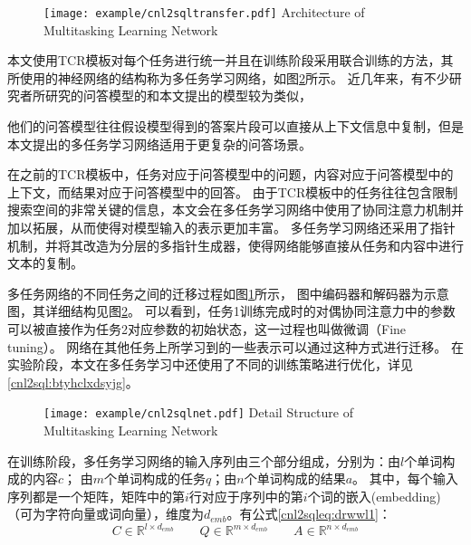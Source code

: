 \begin{figure}[!htp]
  \centering
  \texttt{[image: example/cnl2sqltransfer.pdf]}
    {Architecture of Multitasking Learning Network}
  \label{fig:cnl2sqltransfer}
\end{figure}

本文使用TCR模板对每个任务进行统一并且在训练阶段采用联合训练的方法，其所使用的神经网络的结构称为多任务学习网络，如图\ref{fig:cnl2sqlnet}所示。
近几年来，有不少研究者所研究的问答模型\cite{wang2016machine,seo2016bidirectional,xiong2017dcn+}的和本文提出的模型较为类似，

他们的问答模型往往假设模型得到的答案片段可以直接从上下文信息中复制，但是本文提出的多任务学习网络适用于更复杂的问答场景。

在之前的TCR模板中，任务对应于问答模型中的问题，内容对应于问答模型中的上下文，而结果对应于问答模型中的回答。
由于TCR模板中的任务往往包含限制搜索空间的非常关键的信息，本文会在多任务学习网络中使用了协同注意力机制\cite{vaswani2017attention}并加以拓展，从而使得对模型输入的表示更加丰富。
多任务学习网络还采用了指针机制\cite{vinyals2015pointer}，并将其改造为分层的多指针生成器，使得网络能够直接从任务和内容中进行文本的复制。



多任务网络的不同任务之间的迁移过程如图\ref{fig:cnl2sqltransfer}所示，
图中编码器和解码器为示意图，其详细结构见图\ref{fig:cnl2sqlnet}。
可以看到，任务1训练完成时的对偶协同注意力中的参数可以被直接作为任务2对应参数的初始状态，这一过程也叫做微调（Fine tuning）。
网络在其他任务上所学习到的一些表示可以通过这种方式进行迁移。
在实验阶段，本文在多任务学习中还使用了不同的训练策略进行优化，详见\ref{cnl2sql:btyhclxdsyjg}。

\begin{figure}[!htp]
  \centering
  \texttt{[image: example/cnl2sqlnet.pdf]}
    {Detail Structure of Multitasking Learning Network}
  \label{fig:cnl2sqlnet}
\end{figure}


在训练阶段，多任务学习网络的输入序列由三个部分组成，分别为：由$l$个单词构成的内容$c$；
由$m$个单词构成的任务$q$；由$n$个单词构成的结果$a$。
其中，每个输入序列都是一个矩阵，矩阵中的第$i$行对应于序列中的第$i$个词的嵌入(embedding)（可为字符向量或词向量），维度为$d_{emb}$。有公式\ref{cnl2sqleq:drwwl1}：
\begin{equation}
    \label{cnl2sqleq:drwwl1}
    C \in \mathbb{R}^{l \times d_{emb}} \qquad Q \in \mathbb{R}^{m \times d_{emb}} \qquad A \in \mathbb{R}^{n \times d_{emb}}
  \end{equation}



